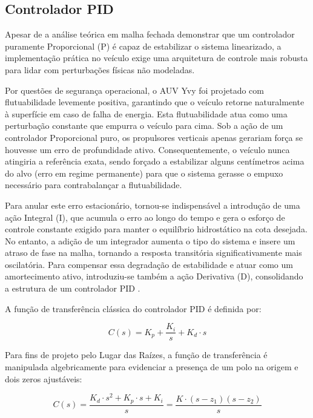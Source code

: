 \documentclass[12pt, a4paper]{article}
\begin{document}
		\subsection{Controlador PID}

			Apesar de a análise teórica em malha fechada demonstrar que um controlador puramente Proporcional (P) é capaz de estabilizar o sistema linearizado, a implementação prática no veículo exige uma arquitetura de controle mais robusta para lidar com perturbações físicas não modeladas.

			Por questões de segurança operacional, o AUV Yvy foi projetado com flutuabilidade levemente positiva, garantindo que o veículo retorne naturalmente à superfície em caso de falha de energia. Esta flutuabilidade atua como uma perturbação constante que empurra o veículo para cima. Sob a ação de um controlador Proporcional puro, os propulsores verticais apenas gerariam força se houvesse um erro de profundidade ativo. Consequentemente, o veículo nunca atingiria a referência exata, sendo forçado a estabilizar alguns centímetros acima do alvo (erro em regime permanente) para que o sistema gerasse o empuxo necessário para contrabalançar a flutuabilidade.

			Para anular este erro estacionário, tornou-se indispensável a introdução de uma ação Integral (I), que acumula o erro ao longo do tempo e gera o esforço de controle constante exigido para manter o equilíbrio hidrostático na cota desejada. No entanto, a adição de um integrador aumenta o tipo do sistema e insere um atraso de fase na malha, tornando a resposta transitória significativamente mais oscilatória. Para compensar essa degradação de estabilidade e atuar como um amortecimento ativo, introduziu-se também a ação Derivativa (D), consolidando a estrutura de um controlador PID \cite{ogata, dorf}.

			A função de transferência clássica do controlador PID é definida por:

			\begin{equation}
				C(s) = K_p + \frac{K_i}{s} + K_d \cdot s
			\end{equation}

			Para fins de projeto pelo Lugar das Raízes, a função de transferência é manipulada algebricamente para evidenciar a presença de um polo na origem e dois zeros ajustáveis:

			\begin{equation}
				C(s) = \frac{K_d \cdot s^2 + K_p \cdot s + K_i}{s} = \frac{K \cdot (s - z_1)(s - z_2)}{s}
				\label{eq:pidzeros}
			\end{equation}
\end{document}
